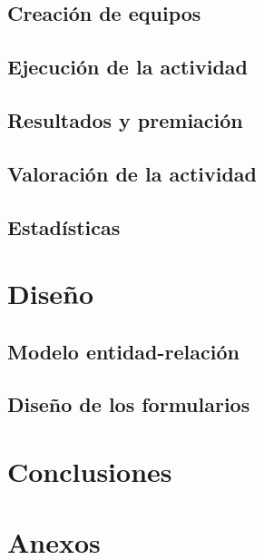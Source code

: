\documentclass{article}
\begin{document}
\subsection{Creación de equipos}

\subsection{Ejecución de la actividad}

\subsection{Resultados y premiación}

\subsection{Valoración de la actividad}

\subsection{Estadísticas}

\section{Diseño}

\subsection{Modelo entidad-relación}

\subsection{Diseño de los formularios}

\section{Conclusiones}




\newpage

\thispagestyle{empty}

\vspace*{0.3\textwidth}

\begin{figure}[h]
  \centering
  
\end{figure}



\newpage

\section{Anexos}
\label{sec:anexos}


\label{doc:ficha-tecnica}

\end{document}

